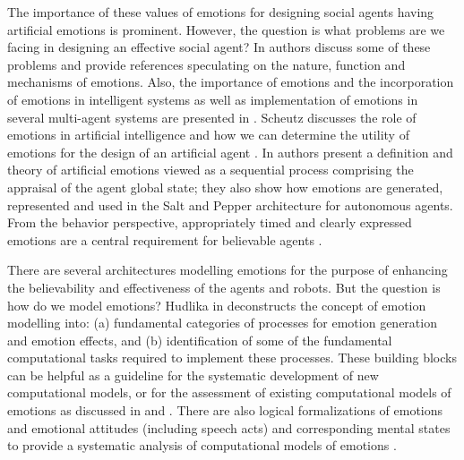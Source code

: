 \documentclass[12pt]{report}
\begin{document}
The importance of these values of emotions for designing social agents having
artificial emotions is prominent. However, the question is what problems are we
facing in designing an effective social agent? In
\cite{freitas:artificial-emotions-ready} authors discuss some of these problems
and provide references speculating on the nature, function and mechanisms of
emotions. Also, the importance of emotions and the incorporation of emotions in
intelligent systems as well as implementation of emotions in several multi-agent
systems are presented in \cite{miranda:emotions-humans-ai}. Scheutz discusses
the role of emotions in artificial intelligence and how we can determine the
utility of emotions for the design of an artificial agent
\cite{scheutz:emotion-role}. In \cite{botelho:machinery-emotions} authors
present a definition and theory of artificial emotions viewed as a sequential
process comprising the appraisal of the agent global state; they also show how
emotions are generated, represented and used in the Salt and Pepper architecture
for autonomous agents. From the behavior perspective, appropriately timed and
clearly expressed emotions are a central requirement for believable agents
\cite{bates:emotion-roles}.

There are several architectures modelling emotions for the purpose of enhancing
the believability and effectiveness of the agents and robots. But the question
is how do we model emotions? Hudlika in \cite{hudlicka:modeling-emotion}
deconstructs the concept of emotion modelling into: (a) fundamental categories
of processes for emotion generation and emotion effects, and (b) identification
of some of the fundamental computational tasks required to implement these
processes. These building blocks can be helpful as a guideline for the
systematic development of new computational models, or for the assessment of
existing computational models of emotions as discussed in
\cite{lin:computational-models-emotion} and \cite{marsella:computational}. There
are also logical formalizations of emotions and emotional attitudes (including
speech acts) and corresponding mental states to provide a systematic analysis
of computational models of emotions \cite{adam:logical-formalization,
grant:model-intention-formation, guiraud:emotions-formalization-speech-acts}.
\end{document}
